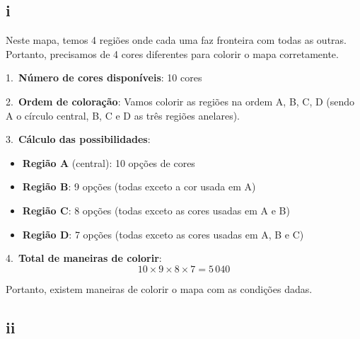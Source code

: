 \documentclass[12pt,a4paper]{article}
\begin{document}
    \subsection*{i}

    \vspace{0.5cm}


    \vspace{0.5cm}

    Neste mapa, temos 4 regiões onde cada uma faz fronteira com todas as outras. Portanto, precisamos de 4 cores diferentes para colorir o mapa corretamente.

    1.~\textbf{Número de cores disponíveis}: 10 cores

    2.~\textbf{Ordem de coloração}: Vamos colorir as regiões na ordem A, B, C, D (sendo A o círculo central, B, C e D as três regiões anelares).

    3.~\textbf{Cálculo das possibilidades}:
    \begin{itemize}
        \item \textbf{Região A} (central): 10 opções de cores
        \item \textbf{Região B}: 9 opções (todas exceto a cor usada em A)
        \item \textbf{Região C}: 8 opções (todas exceto as cores usadas em A e B)
        \item \textbf{Região D}: 7 opções (todas exceto as cores usadas em A, B e C)
    \end{itemize}

    4.~\textbf{Total de maneiras de colorir}:
    \[
    10 \times 9 \times 8 \times 7 = 5\,040
    \]

    Portanto, existem  maneiras de colorir o mapa com as condições dadas.

    \subsection*{ii}

\end{document}

